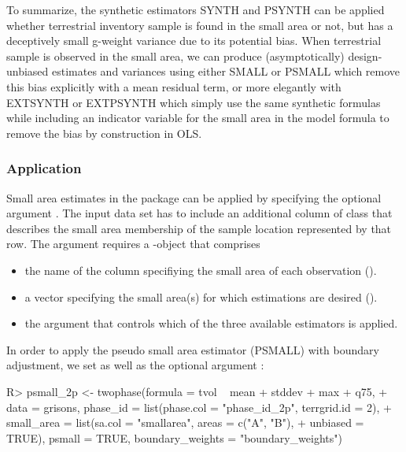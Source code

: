 To summarize, the synthetic estimators SYNTH and PSYNTH can be applied whether terrestrial inventory sample is found in the small area or not, but has a deceptively small g-weight variance due to its potential bias.  When terrestrial sample is observed in the small area, we can produce (asymptotically) design-unbiased estimates and variances using either SMALL or PSMALL which remove this bias explicitly with a mean residual term, or more elegantly with EXTSYNTH or EXTPSYNTH which simply use the same synthetic formulas while including an indicator variable for the small area in the model formula to remove the bias by construction in OLS.


\subsubsection{Application}

Small area estimates in the  package can be applied by specifying the optional argument . The input data set has to include an additional column of class  that describes the small area membership of the sample location represented by that row. The argument  requires a -object that comprises

\begin{itemize}
  \itemsep0em
  \item the name of the column specifiying the small area of each observation ().
  \item a vector specifying the small area(s) for which estimations are desired ().
  \item the argument  that controls which of the three available estimators is applied.
\end{itemize}

In order to apply the pseudo small area estimator (PSMALL) with boundary adjustment, we set  as well as the optional argument :
\begin{small}
\begin{Schunk}
\begin{Sinput}
R> psmall_2p <- twophase(formula = tvol ~ mean + stddev + max + q75, 
+    data = grisons, phase_id = list(phase.col = "phase_id_2p", terrgrid.id = 2),
+    small_area = list(sa.col = "smallarea", areas = c("A", "B"),
+    unbiased = TRUE), psmall = TRUE, boundary_weights = "boundary_weights")
\end{Sinput}
\end{Schunk}
\end{small}

